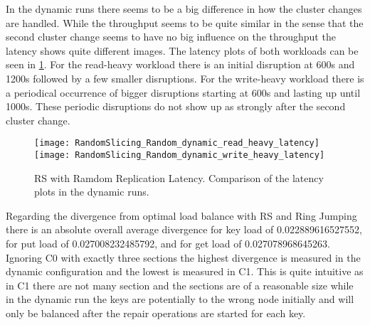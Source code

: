 In the dynamic runs there seems to be a big difference in how the cluster changes are handled.
While the throughput seems to be quite similar in the sense that the second cluster change seems to have no big influence on the throughput the latency shows quite different images.
The latency plots of both workloads can be seen in \cref{fig:random_slicing_random_dynamic_latency}.
For the read-heavy workload there is an initial disruption at 600s and 1200s followed by a few smaller disruptions.
For the write-heavy workload there is a periodical occurrence of bigger disruptions starting at 600s and lasting up until 1000s.
These periodic disruptions do not show up as strongly after the second cluster change.
\begin{figure}
\texttt{[image: RandomSlicing\_Random\_dynamic\_read\_heavy\_latency]}
\texttt{[image: RandomSlicing\_Random\_dynamic\_write\_heavy\_latency]}
\caption[\ac{RS} with Ramdom Replication Latency]{\ac{RS} with Ramdom Replication Latency. Comparison of the latency plots in the dynamic runs.}
\label{fig:random_slicing_random_dynamic_latency}
\end{figure}

Regarding the divergence from optimal load balance with \ac{RS} and Ring Jumping there is an absolute overall average divergence for key load of 0.022889616527552, for put load of 0.027008232485792, and for get load of 0.027078968645263.
Ignoring C0 with exactly three sections the highest divergence is measured in the dynamic configuration and the lowest is measured in C1.
This is quite intuitive as in C1 there are not many section and the sections are of a reasonable size while in the dynamic run the keys are potentially to the wrong node initially and will only be balanced after the repair operations are started for each key.

